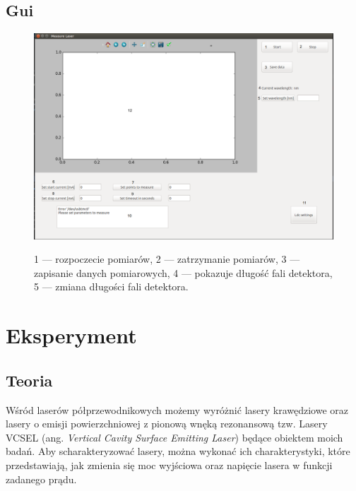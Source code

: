 \documentclass[a4paper, portrait,12pt]{report}
\begin{document}
\section{Gui}
\begin{figure}[h]
\center
  \includegraphics[scale=0.35]{gui.png}
  \label{rys1}
  \caption{1 --- rozpoczecie pomiarów, 2 --- zatrzymanie pomiarów, 3 --- zapisanie danych pomiarowych, 4 --- pokazuje długość fali detektora, 5 --- zmiana długości fali detektora.} 
\end{figure}
\chapter{Eksperyment} \label{Eksperyment}
\section{Teoria}
Wśród laserów półprzewodnikowych możemy wyróżnić lasery krawędziowe oraz lasery o emisji powierzchniowej z pionową wnęką rezonansową tzw. Lasery VCSEL (ang. \textit{Vertical Cavity Surface Emitting Laser}) będące obiektem moich badań. Aby scharakteryzować lasery, można wykonać ich charakterystyki, które przedstawiają, jak zmienia się moc wyjściowa oraz napięcie lasera w funkcji zadanego prądu. \\
\end{document}
